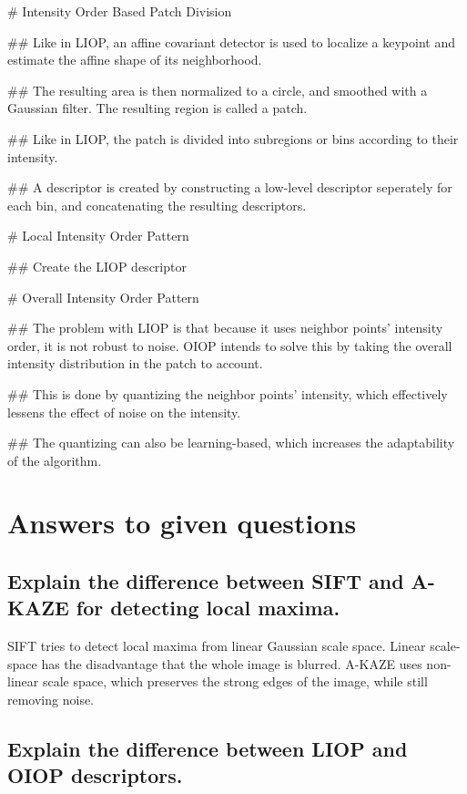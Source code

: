 \NewList{}
\begin{easylist}

  # Intensity Order Based Patch Division

  ## Like in LIOP, an affine covariant detector is used to localize a keypoint
  and estimate the affine shape of its neighborhood.

  ## The resulting area is then normalized to a circle, and smoothed with a
  Gaussian filter. The resulting region is called a patch.

  ## Like in LIOP, the patch is divided into subregions or bins according to
  their intensity.

  ## A descriptor is created by constructing a low-level descriptor seperately
  for each bin, and concatenating the resulting descriptors.

  # Local Intensity Order Pattern

  ## Create the LIOP descriptor
 
  # Overall Intensity Order Pattern

  ## The problem with LIOP is that because it uses neighbor points' intensity
  order, it is not robust to noise. OIOP intends to solve this by taking the
  overall intensity distribution in the patch to account.

  ## This is done by quantizing the neighbor points' intensity, which
  effectively lessens the effect of noise on the intensity.

  ## The quantizing can also be learning-based, which increases the
  adaptability of the algorithm.

\end{easylist}

\section{Answers to given questions}

\subsection{Explain the difference between SIFT and A-KAZE for detecting local
maxima.}

SIFT tries to detect local maxima from linear Gaussian scale space. Linear
scale-space has the disadvantage that the whole image is blurred. A-KAZE uses
non-linear scale space, which preserves the strong edges of the image, while
still removing noise.

\subsection{Explain the difference between LIOP and OIOP descriptors.}

